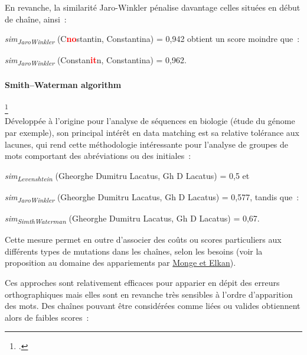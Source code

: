 \documentclass[a4paper,12pt,twoside]{book}
\begin{document}
                En revanche, la similarité Jaro-Winkler pénalise davantage celles situées en début de chaîne, ainsi~:
                
                \textit{sim\textsubscript{JaroWinkler}} (C\textcolor{red}{\textbf{no}}stantin, Constantina) = 0,942 obtient un score moindre que~:
                \vspace{0.2cm}
                
                \textit{sim\textsubscript{JaroWinkler}} (Constan\textcolor{red}{\textbf{it}}n, Constantina) = 0,962.
                
                \paragraph{Smith–Waterman algorithm}\footcite{SmithWatermanAlgorithm2022} \\
                
                Développée à l'origine pour l'analyse de séquences en biologie (étude du génome par exemple), son principal intérêt en data matching est sa relative tolérance aux lacunes, qui rend cette méthodologie intéressante pour l'analyse de groupes de mots comportant des abréviations ou des initiales~:
                
                
                \textit{sim\textsubscript{Levenshtein}} (Gheorghe Dumitru Lacatus, Gh D Lacatus) = 0,5 et
                
                
                \textit{sim\textsubscript{JaroWinkler}} (Gheorghe Dumitru Lacatus, Gh D Lacatus) = 0,577,
                \newline
                tandis que~:
                
                \textit{sim\textsubscript{SimthWaterman}} (Gheorghe Dumitru Lacatus, Gh D Lacatus) = 0,67.
                \newline
                
                Cette mesure permet en outre d'associer des coûts ou scores particuliers aux différents types de mutations dans les chaînes, selon les besoins (voir la proposition au domaine des appariements par \hyperref[monge]{Monge et Elkan}).
                \newpage
                
                Ces approches sont relativement efficaces pour apparier en dépit des erreurs orthographiques mais elles sont en revanche très sensibles à l'ordre d'apparition des mots. Des chaînes pouvant être considérées comme liées ou valides obtiennent alors de faibles scores~:
                \smallskip
                
\end{document}

